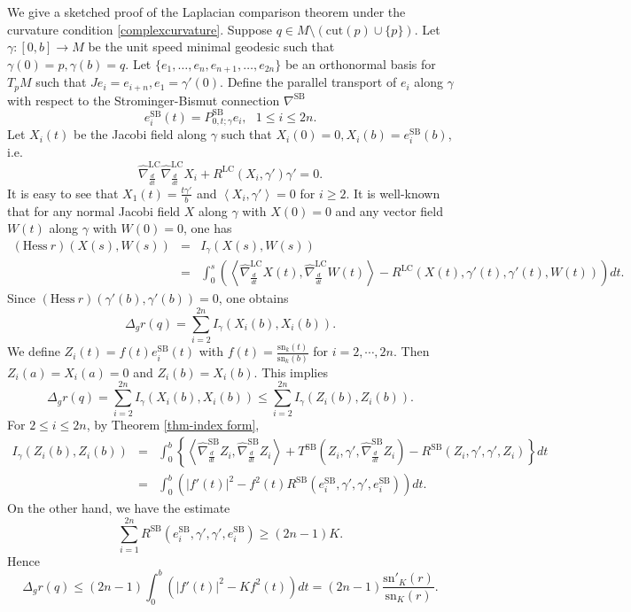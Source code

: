 \documentclass[12pt, reqno]{amsart}
\theoremstyle{plain}
\theoremstyle{definition}
\newcommand{\la}{\langle}
\newcommand{\ra}{\rangle}
\newcommand{\beq}{\begin{equation}}
\newcommand{\eeq}{\end{equation}}
\newcommand{\ee}{\end{eqnarray*}}
\newcommand{\be}{\begin{eqnarray*}}
\renewcommand{\hat}{\widehat}
\renewcommand{\>}{\rightarrow}
\newcommand{\LL}{\left\langle}
\newcommand{\RL}{\right\rangle}
\newcommand{\MS}{\mathrm{SB}}
\newcommand{\MLC}{\mathrm{LC}}
\newcommand{\sn}{\mathrm{sn}}
\renewcommand{\>}{\rightarrow}
\numberwithin{equation}{section} %
\begin{document}
   We give a sketched proof of the Laplacian comparison theorem under the curvature condition \eqref{complexcurvature}.
   Suppose $q\in M\setminus(\mathrm{cut}(p)\cup\{p\})$. Let $\gamma:[0,b]\to M$ be the unit speed minimal geodesic such that $\gamma(0)=p,\gamma(b)=q$.
   Let $\{e_1,\ldots,e_n,e_{n+1},\ldots,e_{2n}\}$ be an orthonormal basis for $T_pM$ such that $Je_i=e_{i+n},e_1=\gamma'(0)$.
   Define the parallel transport of $e_i$ along $\gamma$ with respect to the Strominger-Bismut connection $\nabla^\MS$
   $$
   e^\MS_i(t)=P_{0,t;\gamma}^{\MS}e_i,\ \ \  1\leq i\leq 2n.
   $$
   Let $X_i(t)$ be the Jacobi field along $\gamma$ such that $X_i(0)=0,X_i(b)=e^\MS_i(b)$, i.e.
   $$\hat\nabla^{\MLC}_{\frac{d}{dt}}\hat\nabla^{\MLC}_{\frac{d}{dt}} X_i+R^{\MLC}(X_i,\gamma')\gamma'=0.$$
   It is easy to see that
   $X_1(t)=\frac{t \gamma'}{b}$ and $\LL X_i,\gamma'\RL=0$ for $i\geq 2$.
   It is well-known that for any normal Jacobi
   field $X$ along $\gamma$ with $X(0)=0$ and
   any vector field $W(t)$ along $\gamma$ with $W(0)=0$, one has
   \begin{eqnarray} \left( \mathrm{Hess}\ r\right) (X(s), W(s))\nonumber&=&I_\gamma (X(s), W(s))\\ \nonumber&=&\int_0^s \left(\left\la \hat\nabla^{\MLC}_{\frac{d}{dt}} X(t), \hat\nabla^{\MLC}_{\frac{d}{dt}} W(t)\right\ra- R^{\MLC}(X(t),\gamma'(t),\gamma'(t), W(t))\right)dt.\end{eqnarray}
   Since $ \left( \mathrm{Hess}\ r\right) (\gamma'(b), \gamma'(b))=0$,   one obtains
   \beq
   \Delta_g r(q)=\sum_{i=2}^{2n}I_\gamma(X_i(b),X_i(b)).
   \eeq
   We define
   $
   Z_i(t)=f(t)e^\MS_i(t)
   $
   with $f(t)=\frac{\sn_k(t)}{\sn_k(b)}$ for $i=2,\cdots, 2n$.   Then $Z_i(a)=X_i(a)=0$ and $Z_i(b)=X_i(b)$. This implies
   \beq \Delta_g r(q)=\sum_{i=2}^{2n}I_\gamma (X_i(b),X_i(b))\leq \sum_{i=2}^{2n}I_\gamma(Z_i(b),Z_i(b)).\eeq
   For $2\leq i\leq 2n$, by Theorem \ref{thm-index form},
   \be I_\gamma(Z_i(b),Z_i(b))&=&\int_0^b\left\{\LL\hat{\nabla}^{\MS}_{\frac{d}{d t}}Z_i,\hat{\nabla}^{\MS}_{\frac{d}{d t}}Z_i\RL+T^{\MS}\left(Z_i,\gamma',\hat{\nabla}^{\MS}_{\frac{d}{d t}}Z_i\right)-R^{\MS}(Z_i,\gamma',\gamma',Z_i)\right\}dt\\
   &=&\int_0^b\left(|f'(t)|^2-f^2(t)R^{\MS}(e^\MS_i,\gamma',\gamma',e^\MS_i) \right)dt.\ee
 On the other hand,  we have the estimate
   $$\sum_{i=1}^{2n} R^{\MS}(e^\MS_i,\gamma',\gamma',e^\MS_i) \geq (2n-1)K.$$
   Hence
   \beq
   \Delta_g r(q)
   \leq(2n-1)\int_0^b\left(|f'(t)|^2-Kf^2(t)\right)dt
   =(2n-1)  \frac{\sn'_K(r)}{\sn_K(r)}.\label{Laplacian}
   \eeq 
   
\end{document}
